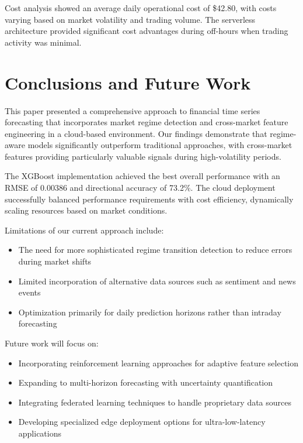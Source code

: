 \documentclass[conference]{IEEEtran}
\begin{document}
Cost analysis showed an average daily operational cost of \$42.80, with costs varying based on market volatility and trading volume. The serverless architecture provided significant cost advantages during off-hours when trading activity was minimal.

\section{Conclusions and Future Work}
This paper presented a comprehensive approach to financial time series forecasting that incorporates market regime detection and cross-market feature engineering in a cloud-based environment. Our findings demonstrate that regime-aware models significantly outperform traditional approaches, with cross-market features providing particularly valuable signals during high-volatility periods.

The XGBoost implementation achieved the best overall performance with an RMSE of 0.00386 and directional accuracy of 73.2\%. The cloud deployment successfully balanced performance requirements with cost efficiency, dynamically scaling resources based on market conditions.

Limitations of our current approach include:
\begin{itemize}
    \item The need for more sophisticated regime transition detection to reduce errors during market shifts
    \item Limited incorporation of alternative data sources such as sentiment and news events
    \item Optimization primarily for daily prediction horizons rather than intraday forecasting
\end{itemize}

Future work will focus on:
\begin{itemize}
    \item Incorporating reinforcement learning approaches for adaptive feature selection
    \item Expanding to multi-horizon forecasting with uncertainty quantification
    \item Integrating federated learning techniques to handle proprietary data sources
    \item Developing specialized edge deployment options for ultra-low-latency applications
\end{itemize}
\end{document}
